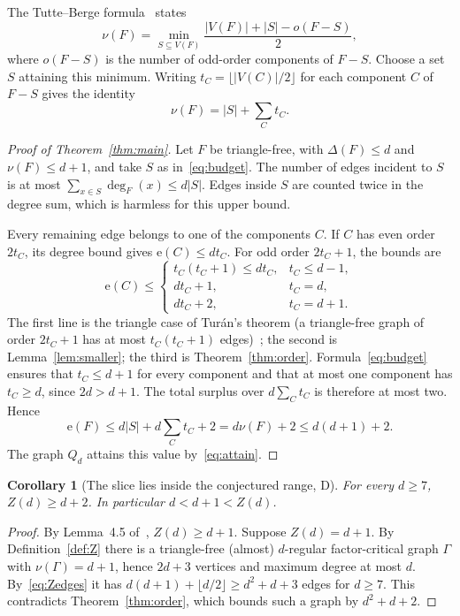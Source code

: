 \documentclass[11pt]{article}
\newtheorem{corollary}[theorem]{Corollary}
\theoremstyle{remark}
\newcommand{\e}{\mathrm{e}}
\begin{document}
The Tutte--Berge formula~\cite{Berge,Goemans} states
\begin{equation}\label{eq:TB}
\nu(F)=\min_{S\subseteq V(F)}\frac{|V(F)|+|S|-o(F-S)}2,
\end{equation}
where $o(F-S)$ is the number of odd-order components of $F-S$. Choose a set $S$ attaining this minimum. Writing $t_C=\lfloor |V(C)|/2\rfloor$ for each component $C$ of $F-S$ gives the identity
\begin{equation}\label{eq:budget}
\nu(F)=|S|+\sum_C t_C.
\end{equation}

\begin{proof}[Proof of Theorem~\ref{thm:main}]
Let $F$ be triangle-free, with $\Delta(F)\le d$ and $\nu(F)\le d+1$, and take $S$ as in~\eqref{eq:budget}. The number of edges incident to $S$ is at most $\sum_{x\in S}\deg_F(x)\le d|S|$. Edges inside $S$ are counted twice in the degree sum, which is harmless for this upper bound.

Every remaining edge belongs to one of the components $C$. If $C$ has even order $2t_C$, its degree bound gives $\e(C)\le dt_C$. For odd order $2t_C+1$, the bounds are
\begin{equation}
\e(C)\le
\begin{cases}
t_C(t_C+1)\le dt_C,&t_C\le d-1,\\
dt_C+1,&t_C=d,\\
dt_C+2,&t_C=d+1.
\end{cases}
\end{equation}
The first line is the triangle case of Tur\'an's theorem (a triangle-free graph of order $2t_C+1$ has at most $t_C(t_C+1)$ edges)~\cite{Turan}; the second is Lemma~\ref{lem:smaller}; the third is Theorem~\ref{thm:order}. Formula~\eqref{eq:budget} ensures that $t_C\le d+1$ for every component and that at most one component has $t_C\ge d$, since $2d>d+1$. The total surplus over $d\sum_Ct_C$ is therefore at most two. Hence
\begin{equation}
\e(F)\le d|S|+d\sum_Ct_C+2=d\nu(F)+2\le d(d+1)+2.
\end{equation}
The graph $Q_d$ attains this value by~\eqref{eq:attain}.
\end{proof}

\begin{corollary}[The slice lies inside the conjectured range, D]\label{cor:Z}
For every $d\ge7$, $Z(d)\ge d+2$. In particular $d<d+1<Z(d)$.
\end{corollary}
\begin{proof}
By Lemma~4.5 of~\cite{AEY}, $Z(d)\ge d+1$. Suppose $Z(d)=d+1$. By Definition~\ref{def:Z} there is a triangle-free (almost) $d$-regular factor-critical graph $\Gamma$ with $\nu(\Gamma)=d+1$, hence $2d+3$ vertices and maximum degree at most $d$. By~\eqref{eq:Zedges} it has $d(d+1)+\lfloor d/2\rfloor\ge d^2+d+3$ edges for $d\ge7$. This contradicts Theorem~\ref{thm:order}, which bounds such a graph by $d^2+d+2$.
\end{proof}
\end{document}
